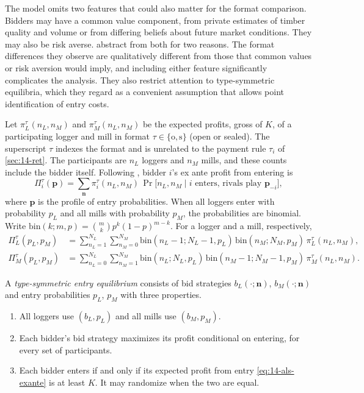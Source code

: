 The model omits two features that could also matter for the format comparison. Bidders may have a
common value component, from private estimates of timber quality and volume or from differing
beliefs about future market conditions. They may also be risk averse. \citet[Section
II.F]{AtheyLevinSeira2011} abstract from both for two reasons. The format differences they observe
are qualitatively different from those that common values or risk aversion would imply, and
including either feature significantly complicates the analysis. They also restrict attention to
type-symmetric equilibria, which they regard as a convenient assumption that allows point
identification of entry costs.

Let $\pi_L^\tau(n_L,n_M)$ and $\pi_M^\tau(n_L,n_M)$ be the expected profits, gross of $K$, of a
participating logger and mill in format $\tau\in\{\mathrm{o},\mathrm{s}\}$ (open or sealed). The superscript $\tau$ indexes the format
and is unrelated to the payment rule $\tau_i$ of \cref{sec:14-ret}. The
participants are $n_L$ loggers and $n_M$ mills, and these counts include the bidder itself. Following
\citet[eq.~(4)]{AtheyLevinSeira2011}, bidder $i$'s ex ante profit from entering is
\begin{equation}\label{eq:14-als-exante}
\Pi_i^\tau(\bm p)=\sum_{\bm n}\pi_i^\tau(n_L,n_M)\,\Pr\bigl[n_L,n_M\mid i\text{ enters, rivals play }\bm p_{-i}\bigr],
\end{equation}
where $\bm p$ is the profile of entry probabilities. When all loggers enter with probability $p_L$ and
all mills with probability $p_M$, the probabilities are binomial. Write
$\mathrm{bin}(k;m,p)=\binom{m}{k}p^k(1-p)^{m-k}$. For a logger and a mill, respectively,
\begin{align}
\Pi_L^\tau(p_L,p_M)&=\sum_{n_L=1}^{N_L}\sum_{n_M=0}^{N_M}\mathrm{bin}(n_L-1;N_L-1,p_L)\,\mathrm{bin}(n_M;N_M,p_M)\,\pi_L^\tau(n_L,n_M),\label{eq:14-als-PiL}\\
\Pi_M^\tau(p_L,p_M)&=\sum_{n_L=0}^{N_L}\sum_{n_M=1}^{N_M}\mathrm{bin}(n_L;N_L,p_L)\,\mathrm{bin}(n_M-1;N_M-1,p_M)\,\pi_M^\tau(n_L,n_M).\label{eq:14-als-PiM}
\end{align}

\begin{definition}\label{def:14-type-symmetric}
A \emph{type-symmetric entry equilibrium} \citep[Section II.A]{AtheyLevinSeira2011} consists of bid
strategies $b_L(\cdot;\bm n)$, $b_M(\cdot;\bm n)$ and entry probabilities $p_L$, $p_M$ with three
properties.
\begin{enumerate}[label=(\roman*)]
\item All loggers use $(b_L,p_L)$ and all mills use $(b_M,p_M)$.
\item Each bidder's bid strategy maximizes its profit conditional on entering, for every set of
participants.
\item Each bidder enters if and only if its expected profit from entry \eqref{eq:14-als-exante} is at
least $K$. It may randomize when the two are equal.
\end{enumerate}
\end{definition}

